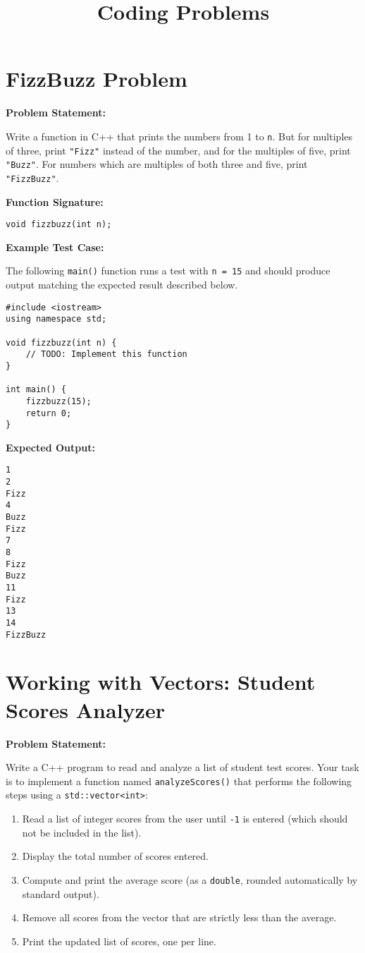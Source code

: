 \documentclass{article}
\title{Coding Problems}
\author{}
\date{}
\begin{document}
\maketitle

\section{FizzBuzz Problem}

\textbf{Problem Statement:}

Write a function in C++ that prints the numbers from 1 to \texttt{n}. But for multiples of three, print \texttt{"Fizz"} instead of the number, and for the multiples of five, print \texttt{"Buzz"}. For numbers which are multiples of both three and five, print \texttt{"FizzBuzz"}.

\textbf{Function Signature:}

\begin{lstlisting}[style=cppstyle]
void fizzbuzz(int n);
\end{lstlisting}

\textbf{Example Test Case:}

The following \texttt{main()} function runs a test with \texttt{n = 15} and should produce output matching the expected result described below.

\begin{lstlisting}[style=cppstyle]
#include <iostream>
using namespace std;

void fizzbuzz(int n) {
    // TODO: Implement this function
}

int main() {
    fizzbuzz(15);
    return 0;
}
\end{lstlisting}

\textbf{Expected Output:}
\begin{verbatim}
1
2
Fizz
4
Buzz
Fizz
7
8
Fizz
Buzz
11
Fizz
13
14
FizzBuzz
\end{verbatim}
\section{Working with Vectors: Student Scores Analyzer}

\textbf{Problem Statement:}

Write a C++ program to read and analyze a list of student test scores. Your task is to implement a function named \texttt{analyzeScores()} that performs the following steps using a \texttt{std::vector<int>}:

\begin{enumerate}
  \item Read a list of integer scores from the user until \texttt{-1} is entered (which should not be included in the list).
  \item Display the total number of scores entered.
  \item Compute and print the average score (as a \texttt{double}, rounded automatically by standard output).
  \item Remove all scores from the vector that are strictly less than the average.
  \item Print the updated list of scores, one per line.
\end{enumerate}
\end{document}
